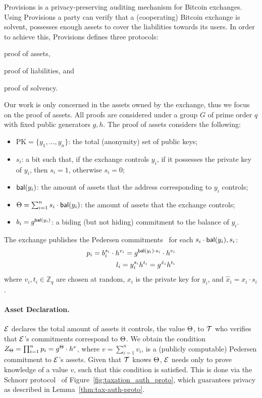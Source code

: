 Provisions is a privacy-preserving auditing mechanism for Bitcoin exchanges.
Using Provisions a party can verify that a (cooperating) Bitcoin exchange is
solvent, \ie possesses enough assets to cover the liabilities towards its
users. In order to achieve this, Provisions defines three protocols:
\begin{inparaenum}[i)]
    \item proof of assets,
    \item proof of liabilities, and
    \item proof of solvency.
\end{inparaenum}
Our work is only concerned in the assets owned by the exchange, thus we focus
on the proof of assets. All proofs are considered under a group $G$ of prime
order $q$ with fixed public generators $g, h$. The proof of assets considers
the following:
\begin{itemize}
    \item $\text{PK} = \{y_1, \dots, y_n \}$: the total (anonymity) set of public keys;
    \item $s_i$: a bit such that, if the exchange controls $y_i$, \ie if it possesses the private key of $y_i$, then $s_i = 1$, otherwise $s_i = 0$;
    \item $\mathsf{bal}(y_i)$: the amount of assets that the address corresponding to $y_i$ controls;
    \item $\Theta = \sum_{i = 1}^n s_i \cdot \mathsf{bal}(y_i)$: the amount of assets that the exchange controls;
    \item $b_i = g^{\mathsf{bal}(y_i)}$: a biding (but not hiding) commitment  to the balance of $y_i$.
\end{itemize}
The exchange publishes the Pedersen commitments~\cite{C:Pedersen91} for each $s_i \cdot
\mathsf{bal}(y_i), s_i$:
\begin{align}
    p_i = b_i^{s_i} \cdot h^{v_i} = g^{\mathsf{bal}(y_i) \cdot s_i} \cdot h^{v_i} \label{eq:balance-commit} \\
    l_i = y_i^{s_i}h^{t_i} =  g^{\hat{x}_i}h^{t_i} \label{eq:ownership-commit}
\end{align}
where $v_i, t_i \in \mathbb{Z}_q$ are chosen at random,
$x_i$ is the private key for $y_i$, and $\hat{x}_i = x_i \cdot s_i$.

\paragraph{Asset Declaration.}\label{subsec:tax-authority-proto}
 $\mathcal{E}$ declares the total amount of assets
it controls, \ie the value $\Theta$,
to  $\mathcal{T}$ who verifies  that $\mathcal{E}$'s commitments
correspond to $\Theta$. We obtain the condition
$Z_\Theta = \prod_{i = 1}^n p_i = g^{\Theta} \cdot h^v$,
where $v = {\sum_{i = 1}^n v_i}$, is a (publicly
computable) Pedersen commitment to $\mathcal{E}$'s assets. Given that $\mathcal{T}$
knows $\Theta$, $\mathcal{E}$ needs only to prove knowledge of a value $v$, such
that this condition is satisfied. This is done via the Schnorr
protocol~\cite{C:Schnorr89} of Figure~\ref{fig:taxation_auth_proto}, which
guarantees privacy as described in Lemma~\ref{thm:tax-auth-proto}.

